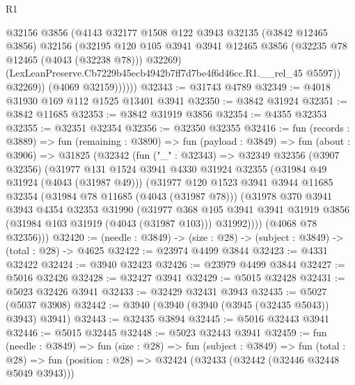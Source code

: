 \begin{lexlean}{R1}
\begin{coremodule}
                  @32156
                  @3856
                  (@4143
                    @32177
                    @1508
                    @122
                    @3943
                    @32135
                    (@3842 @12465 @3856)
                    @32156
                    (@32195
                      @120
                      @105
                      @3941
                      @3941
                      @12465
                      @3856
                      (@32235 @78 @12465 (@4043 (@32238 @78)))
                      @32269)
                    (LexLeanPreserve.Cb7229b45ecb4942b7ff7d7be4f6d46cc.R1.__rel_45 @5597))
                  @32269))
              (@4069 @32159))))))
@32343 := @31743 @4789
@32349 := @4018 @31930 @169 @112 @1525 @13401 @3941
@32350 := @3842 @31924
@32351 := @3842 @11685
@32353 := @3842 @31919 @3856
@32354 := @4355 @32353
@32355 := @32351 @32354
@32356 := @32350 @32355
@32416 := fun (records : @3889) =>
  fun (remaining : @3890) =>
  fun (payload : @3849) =>
  fun (about : @3906) =>
  @31825
    (@32342
      (fun ("_" : @32343) =>
      @32349
        @32356
        (@3907 @32356)
        (@31977
          @131
          @1524
          @3941
          @4330
          @31924
          @32355
          (@31984 @49 @31924 (@4043 (@31987 @49)))
          (@31977
            @120
            @1523
            @3941
            @3944
            @11685
            @32354
            (@31984 @78 @11685 (@4043 (@31987 @78)))
            (@31978
              @370
              @3941
              @3943
              @4354
              @32353
              @31990
              (@31977
                @368
                @105
                @3941
                @3941
                @31919
                @3856
                (@31984 @103 @31919 (@4043 (@31987 @103)))
                @31992))))
        (@4068 @78 @32356)))
@32420 := (needle : @3849) -> (size : @28) -> (subject : @3849) -> (total : @28) -> @4625
@32422 := @23974 @4499 @3844
@32423 := @4331 @32422
@32424 := @3940 @32423
@32426 := @23979 @4499 @3844
@32427 := @5016 @32426
@32428 := @32427 @3941
@32429 := @5015 @32428
@32431 := @5023 @32426 @3941
@32433 := @32429 @32431 @3943
@32435 := @5027 (@5037 @3908)
@32442 := @3940 (@3940 (@3940 (@3945 (@32435 @5043)) @3943) @3941)
@32443 := @32435 @3894
@32445 := @5016 @32443 @3941
@32446 := @5015 @32445
@32448 := @5023 @32443 @3941
@32459 := fun (needle : @3849) =>
  fun (size : @28) =>
  fun (subject : @3849) =>
  fun (total : @28) => fun (position : @28) => @32424 (@32433 (@32442 (@32446 @32448 @5049 @3943)))

\end{coremodule}
\end{lexlean}
